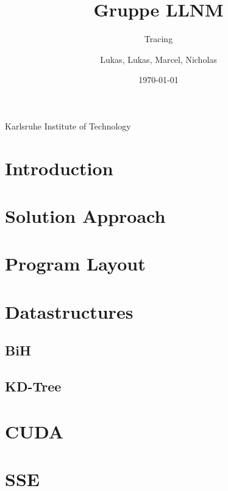 \documentclass[11pt,a4paper,titlepage]{scrartcl}
\newcommand{\university}{Karlsruhe Institute of Technology}
\begin{document}

\title{Gruppe LLNM}
\subtitle{Tracing}
\author{Lukas, Lukas, Marcel, Nicholas}
\date{\today}

\graphicspath{{./images/}}

\makeatletter
\begin{titlepage}
	\centering
	{\LARGE \university \par}
	\vspace{5cm}
	{\LARGE \@title\par}
	\vspace{0.1cm}
	{\normalfont \@subtitle\par}
	\vspace{3cm}
	{\LARGE \@author\par}
	\vfill
	{\LARGE \@date\par}
\end{titlepage}
\makeatother
{}
\sffamily\tableofcontents
\clearpage
{}

\section{Introduction}
\section{Solution Approach}
\section{Program Layout}
\section{Datastructures}
	\subsection{BiH}
	\subsection{KD-Tree}
\section{CUDA}
\section{SSE}
\end{document}
